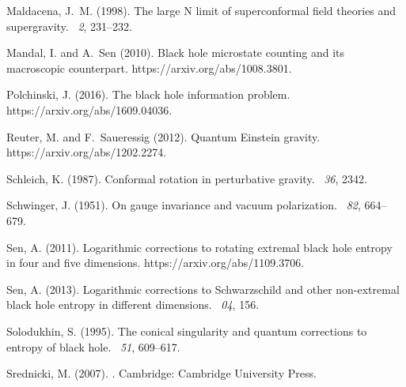 \documentclass[12pt]{article}
\begin{document}
\begin{thebibliography}{}
Maldacena, J.~M. (1998).
\newblock The large {N} limit of superconformal field theories and
  supergravity.
~{\em 2},
  231--232.

Mandal, I. and A.~Sen (2010).
\newblock Black hole microstate counting and its macroscopic counterpart.
\newblock https://arxiv.org/abs/1008.3801.

Polchinski, J. (2016).
\newblock The black hole information problem.
\newblock https://arxiv.org/abs/1609.04036.

Reuter, M. and F.~Saueressig (2012).
\newblock Quantum {E}instein gravity.
\newblock https://arxiv.org/abs/1202.2274.

Schleich, K. (1987).
\newblock Conformal rotation in perturbative gravity.
~{\em 36}, 2342.

Schwinger, J. (1951).
\newblock On gauge invariance and vacuum polarization.
~{\em 82}, 664--679.

Sen, A. (2011).
\newblock Logarithmic corrections to rotating extremal black hole entropy in
  four and five dimensions.
\newblock https://arxiv.org/abs/1109.3706.

Sen, A. (2013).
\newblock Logarithmic corrections to {S}chwarzschild and other non-extremal
  black hole entropy in different dimensions.
~{\em 04}, 156.

Solodukhin, S. (1995).
\newblock The conical singularity and quantum corrections to entropy of black
  hole.
~{\em 51}, 609--617.

Srednicki, M. (2007).
.
\newblock Cambridge: Cambridge University Press.


\end{thebibliography}
\end{document}

